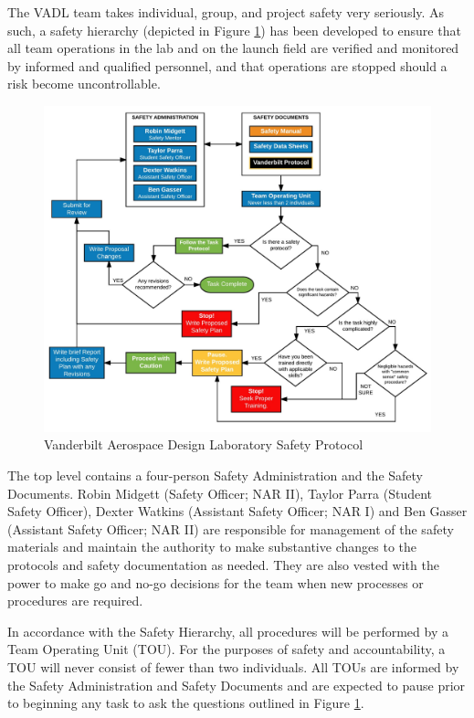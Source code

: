 		The VADL team takes individual, group, and project safety very seriously. As such, a safety hierarchy (depicted in Figure \ref{fig:safety_protocol_flowsheet}) has been developed to ensure that all team operations in the lab and on the launch field are verified and monitored by informed and qualified personnel, and that operations are stopped should a risk become uncontrollable.		
		\FloatBarrier
		\begin{figure}[h]
			\centering
			\includegraphics[width=.95\linewidth]{09_Figures/safety_protocol_flowsheet.jpg}
			\caption{Vanderbilt Aerospace Design Laboratory Safety Protocol}
			\label{fig:safety_protocol_flowsheet}
		\end{figure}
		\FloatBarrier
		
		The top level contains a four-person Safety Administration and the Safety Documents. Robin Midgett (Safety Officer; NAR II), Taylor Parra (Student Safety Officer), Dexter Watkins (Assistant Safety Officer; NAR I) and Ben Gasser (Assistant Safety Officer; NAR II) are responsible for management of the safety materials and maintain the authority to make substantive changes to the protocols and safety documentation as needed. They are also vested with the power to make go and no-go decisions for the team when new processes or procedures are required.
		\bigbreak
	
		In accordance with the Safety Hierarchy, all procedures will be performed by a Team Operating Unit (TOU). For the purposes of safety and accountability, a TOU will never consist of fewer than two individuals. All TOUs are informed by the Safety Administration and Safety Documents and are expected to pause prior to beginning any task to ask the questions outlined in Figure \ref{fig:safety_protocol_flowsheet}. 
		\bigbreak
		
